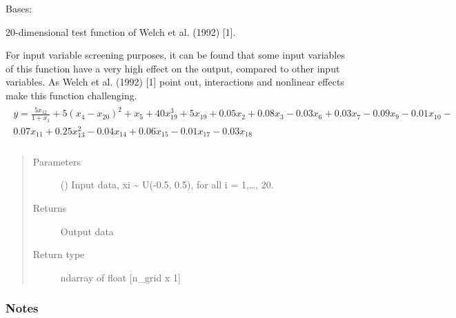 \documentclass[letterpaper,10pt,english,openany,oneside]{sphinxmanual}
\begin{document}

\begin{fulllineitems}
\label{\detokenize{pygpc.testfunctions:pygpc.testfunctions.testfunctions.Welch1992}}
Bases: {\hyperref[\detokenize{pygpc:pygpc.AbstractModel.AbstractModel}]{}}

20-dimensional test function of Welch et al. (1992) {[}1{]}.

For input variable screening purposes, it can be found that some input
variables of this function have a very high effect on the output,
compared to other input variables. As Welch et al. (1992) {[}1{]} point out,
interactions and nonlinear effects make this function challenging.
\begin{align*}\!\begin{aligned}
y = \frac{5 x_{12}}{1 + x_1} + 5 (x_4 - x_{20})^2 + x_5 + 40 x_{19}^3 + 5 x_{19} + 0.05 x_2
+ 0.08 x_3 - 0.03 x_6 + 0.03 x_7 - 0.09 x_9 - 0.01 x_{10} -\\
0.07 x_{11} + 0.25 x_{13}^2 - 0.04 x_{14} + 0.06 x_{15} - 0.01 x_{17} - 0.03 x_{18}\\
\end{aligned}\end{align*}\begin{quote}\begin{description}
\item[{Parameters}] \leavevmode
{}\sphinxstyleliteralstrong{\sphinxupquote{{[}}}\sphinxstyleliteralstrong{\sphinxupquote{{]}}} () \textendash{} Input data, xi \textasciitilde{} U(-0.5, 0.5), for all i = 1,…, 20.

\item[{Returns}] \leavevmode
{} \textendash{} Output data

\item[{Return type}] \leavevmode
ndarray of float {[}n\_grid x 1{]}

\end{description}\end{quote}
\subsubsection*{Notes}


\end{fulllineitems}
\end{document}
